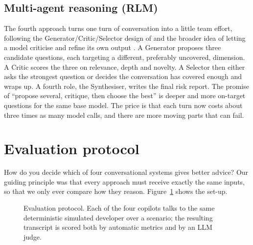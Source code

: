 \documentclass[11pt]{article}
\begin{document}
\subsection{Multi-agent reasoning (RLM)}
The fourth approach turns one turn of conversation into a little team effort, following
the Generator/Critic/Selector design of \citet{deng2025ethical} and the broader idea of
letting a model criticise and refine its own output \citep{shinn2023reflexion,
madaan2023selfrefine}. A Generator proposes three candidate questions, each
targeting a different, preferably uncovered, dimension. A Critic scores the three
on relevance, depth and novelty. A Selector then either asks the strongest
question or decides the conversation has covered enough and wraps up. A fourth role, the
Synthesiser, writes the final risk report. The promise of ``propose several,
critique, then choose the best'' is deeper and more on-target questions for the same base
model. The price is that each turn now costs about three times as many model calls, and
there are more moving parts that can fail.
\section{Evaluation protocol}
\label{sec:eval}
How do you decide which of four conversational systems gives better advice? Our guiding
principle was that every approach must receive exactly the same inputs, so that we
only ever compare how they reason. Figure~\ref{fig:eval} shows the set-up.
\begin{figure}[t]
\centering
{}
\caption{Evaluation protocol. Each of the four copilots talks to the same deterministic
simulated developer over a scenario; the resulting transcript is scored both by automatic
metrics and by an LLM judge.}
\label{fig:eval}
\end{figure}
\end{document}
